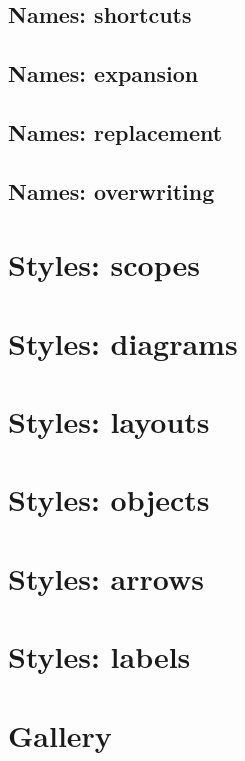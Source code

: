 \subsection{Names: shortcuts}

\newpage
\subsection{Names: expansion}

\newpage
\subsection{Names: replacement}

\newpage
\subsection{Names: overwriting}

\newpage
\section{Styles: scopes}

\newpage
\section{Styles: diagrams}

\newpage
\section{Styles: layouts}

\newpage
\section{Styles: objects}

\newpage
\section{Styles: arrows}

\newpage
\section{Styles: labels}

\newpage
\section{Gallery}


% 


